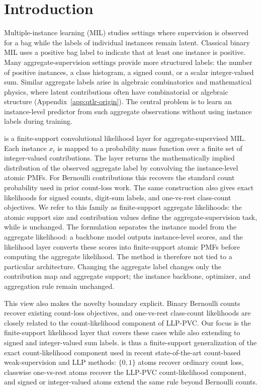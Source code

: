 \section{Introduction}
\label{sec:introduction}

Multiple-instance learning (MIL) studies settings where supervision is observed for a bag while the labels of individual instances remain latent.
Classical binary MIL uses a positive bag label to indicate that at least one instance is positive.
Many aggregate-supervision settings provide more structured labels: the number of positive instances, a class histogram, a signed count, or a scalar integer-valued sum.
Similar aggregate labels arise in algebraic combinatorics and mathematical physics, where latent contributions often have combinatorial or algebraic structure (Appendix~\ref{app:qtlr-origin}).
The central problem is to learn an instance-level predictor from such aggregate observations without using instance labels during training.

\method{} is a finite-support convolutional likelihood layer for aggregate-supervised MIL.
Each instance $x_i$ is mapped to a probability mass function over a finite set of integer-valued contributions.
The layer returns the mathematically implied distribution of the observed aggregate label by convolving the instance-level atomic PMFs.
For Bernoulli contributions this recovers the standard count probability used in prior count-loss work.
The same construction also gives exact likelihoods for signed counts, digit-sum labels, and one-vs-rest class-count objectives.
We refer to this family as finite-support aggregate likelihoods: the atomic support size and contribution values define the aggregate-supervision task, while \method{} is unchanged.
The formulation separates the instance model from the aggregate likelihood: a backbone model outputs instance-level scores, and the likelihood layer converts these scores into finite-support atomic PMFs before computing the aggregate likelihood.
The method is therefore not tied to a particular architecture.
Changing the aggregate label changes only the contribution map and aggregate support; the instance backbone, optimizer, and aggregation rule remain unchanged.



This view also makes the novelty boundary explicit.
Binary Bernoulli counts recover existing count-loss objectives, and one-vs-rest class-count likelihoods are closely related to the count-likelihood component of LLP-PVC.
Our focus is the finite-support likelihood layer that covers these cases while also extending to signed and integer-valued sum labels.
\method{} is thus a finite-support generalization of the exact count-likelihood component used in recent state-of-the-art count-based weak-supervision and LLP methods: $\{0,1\}$ atoms recover ordinary count loss, classwise one-vs-rest atoms recover the LLP-PVC count-likelihood component, and signed or integer-valued atoms extend the same rule beyond Bernoulli counts.

